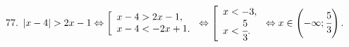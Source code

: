 77. $|x-4|>2x-1\Leftrightarrow\left[\begin{array}{l}x-4>2x-1,\\x-4<-2x+1.\end{array}\right.
\Leftrightarrow\left[\begin{array}{l}x<-3,\\x<\cfrac{5}{3}.\end{array}\right.\Leftrightarrow x\in\left(-\infty;\cfrac{5}{3}\right).$\\
